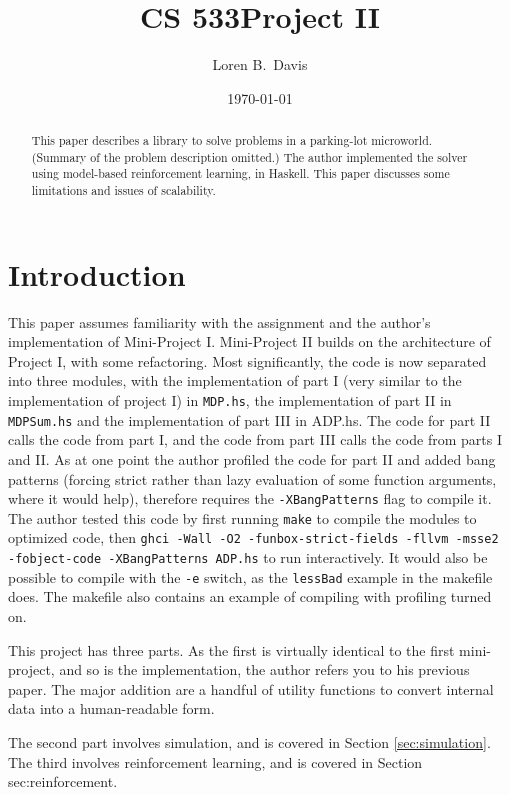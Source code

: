 \documentclass[paper=letter,pagesize=automedia,twoside=false,12pt]{scrartcl}
\title{CS \textup{533}\quad{}Project II}
\author{Loren B.\ Davis}
\date{\oldstylenums\today}
\DeclareRobustCommand{\abbrev}[1]{{\addfontfeature{Letters=UppercaseSmallCaps}{#1}}}
\theoremstyle{plain}%
\theoremstyle{definition}
\theoremstyle{remark}
\providecommand{\abbrev}[1]{{\scshape {#1}}}
\begin{document}
\maketitle
\begin{abstract}
This paper describes a library to solve problems in a parking-lot microworld.  (Summary of the problem description omitted.)  The author implemented the solver using model-based reinforcement learning, in Haskell.  This paper discusses some limitations and issues of scalability.
\end{abstract}

\section{Introduction}\label{sec:intro}
This paper assumes familiarity with the assignment and the author’s implementation of Mini-Project I.  Mini-Project II builds on the architecture of Project I, with some refactoring.  Most significantly, the code is now separated into three modules, with the implementation of part I (very similar to the implementation of project I) in \texttt{MDP.hs}, the implementation of part II in \texttt{MDPSum.hs} and the implementation of part III in {ADP.hs}.  The code for part II calls the code from part I, and the code from part III calls the code from parts I and II.  As at one point the author profiled the code for part II and added bang patterns (forcing strict rather than lazy evaluation of some function arguments, where it would help), \abbrev{GHC} therefore requires the \texttt{-XBangPatterns} flag to compile it.  The author tested this code by first running \texttt{make} to compile the modules to optimized code, then \texttt{ghci -Wall -O2 -funbox-strict-fields -fllvm -msse2 -fobject-code -XBangPatterns ADP.hs} to run interactively.  It would also be possible to compile with the \texttt{-e} switch, as the \texttt{lessBad} example in the makefile does.  The makefile also contains an example of compiling with profiling turned on.

This project has three parts.  As the first is virtually identical to the first mini-project, and so is the implementation, the author refers you to his previous paper.  The major addition are a handful of utility functions to convert internal data into a human-readable form.

The second part involves simulation, and is covered in Section \ref{sec:simulation}.  The third involves reinforcement learning, and is covered in Section {sec:reinforcement}.
\end{document}

